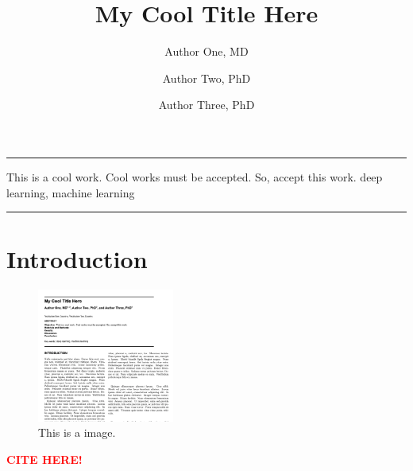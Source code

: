 \documentclass[twocolumn, 8pt]{article}
\title{My Cool Title Here}
\author[1, 2]{Author One, MD}
\author[2]{Author Two, PhD}
\author[1]{Author Three, PhD}
\affil[1]{Institution One, Country;}
\affil[2]{Institution Two, Country}
\date{}
\begin{document}
\par\noindent\rule[-7pt]{15.5cm}{0.2em}
\begin{strip}
    \begin{minipage}{.88\textwidth}
        \maketitle
        \small
        \abstractSection
        {This is a cool work. Cool works must be accepted. So, accept this work.} %
        {} %
        {} %
        {} %
        {} %
        {deep learning, machine learning} %
        
        \par\noindent\rule[-7pt]{15.5cm}{0.2em}
        \hspace{2cm}
    \end{minipage}
\end{strip}


\section*{Introduction}

\begin{figure}
    \centering
    \setlength{\abovecaptionskip}{0pt}
    \includegraphics[width=0.4\textwidth]{img/example.png}
    \caption{This is a image.}
    \label{fig::local_pred_model}
\end{figure}

\lipsum[3-8] \cite{he2016deep} \textcolor{red}{\textbf{CITE HERE!}}
\end{document}
